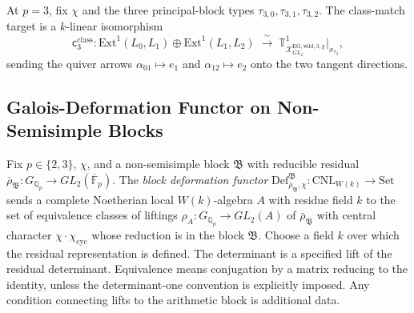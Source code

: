 \begin{definition}[the class-match target, \(p=3\)]
\label{v4-arith:w6-f:def:class-match-p3}
At \(p=3\), fix \(\chi\) and the three
principal-block types \(\tau_{3,0},\tau_{3,1},\tau_{3,2}\). The
class-match target is a \(k\)-linear isomorphism
\begin{equation}
\label{v4-arith:w6-f:eq:class-match-p3}
\mathsf{c}^{\mathrm{class}}_{3}\colon
\mathrm{Ext}^{1}(L_{0},L_{1})\oplus\mathrm{Ext}^{1}(L_{1},L_{2})
\;\xrightarrow{\;\sim\;}\;
\mathbb{T}^{1}_{\mathcal{X}^{\mathrm{EG,wild},3,\chi}_{GL_{2}}}\big|_{x_{\tau_{3}}},
\end{equation}
sending the quiver arrows \(\alpha_{01}\mapsto e_{1}\) and
\(\alpha_{12}\mapsto e_{2}\) onto the two tangent directions.
\end{definition}

\subsection{Galois-Deformation Functor on Non-Semisimple Blocks}

\begin{definition}
\label{v4-arith:w6-f:def:block-deformation}
Fix \(p\in\{2,3\}\), \(\chi\), and a
non-semisimple block \(\mathfrak{B}\) with reducible residual
\(\bar\rho_{\mathfrak{B}}\colon G_{\mathbb{Q}_{p}}\to GL_{2}(\overline{\mathbb{F}}_{p})\).
The \emph{block deformation functor}
\(\mathrm{Def}^{\mathfrak{B}}_{\bar\rho_{\mathfrak{B}},\chi}\colon\mathrm{CNL}_{W(k)}\to\mathrm{Set}\)
sends a complete Noetherian local \(W(k)\)-algebra \(A\) with residue
field \(k\) to the set of equivalence classes of liftings
\(\rho_{A}\colon G_{\mathbb{Q}_{p}}\to GL_{2}(A)\) of
\(\bar\rho_{\mathfrak{B}}\) with central character \(\chi\cdot\chi_{\mathrm{cyc}}\)
whose reduction is in the block \(\mathfrak{B}\).
Choose a field \(k\) over which the residual representation is defined.
The determinant is a specified lift of the residual determinant.
Equivalence means conjugation by a matrix reducing to the identity,
unless the determinant-one convention is explicitly imposed.
Any condition connecting lifts to the arithmetic block is additional data.
\end{definition}

